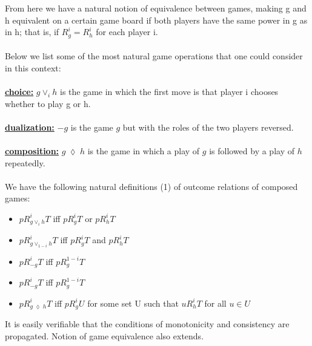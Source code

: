 \documentclass[12pt]{article}
\begin{document}
From here we have a natural notion of equivalence between games, making g and h equivalent on a certain game board if both  players have the same power in g as in h; that is, if $R_{g}^{i}=R_{h}^{i}$ for each player i. \\ \\
Below we list some of the most natural game operations that one could consider in this context: \\ \\
\underline{\textbf{choice:}} $g \vee_{i} h$ is the game in which the first move is that player i chooses whether to play g or h. \\ \\
\underline{\textbf{dualization:}} $-g$ is the game $g$ but with the roles of the two players reversed. \\ \\
\underline{\textbf{composition:}} $g \; \lozenge \; h$ is the game in which a play of $g$ is followed by a play of $h$ repeatedly. \\ \\
We have the following natural definitions (1) of outcome relations of composed games: 
\begin{itemize}
\item $pR^{i}_{g \vee_{i}h}T$ iff $pR_{g}^{i}T$ or $pR_h ^{i}T$
\item $pR^{i}_{g \vee_{1-i} h}T$ iff $pR_{g}^{i}T$ and $pR_h ^{i}T$
\item $pR_{-g}^{i}T$ iff $pR_{g}^{1-i}T$
\item $pR_{-g}^{i}T$ iff $pR_{g}^{1-i}T$
\item $pR_{g \; \lozenge \; h}^{i}T$ iff $pR_{g}^{i}U$ for some set U such that $uR_{h}^{i}T$ for all $u \in U$
\end{itemize} 
It is easily verifiable that the conditions of monotonicity and consistency are propagated. Notion of game equivalence also extends.
\end{document}
